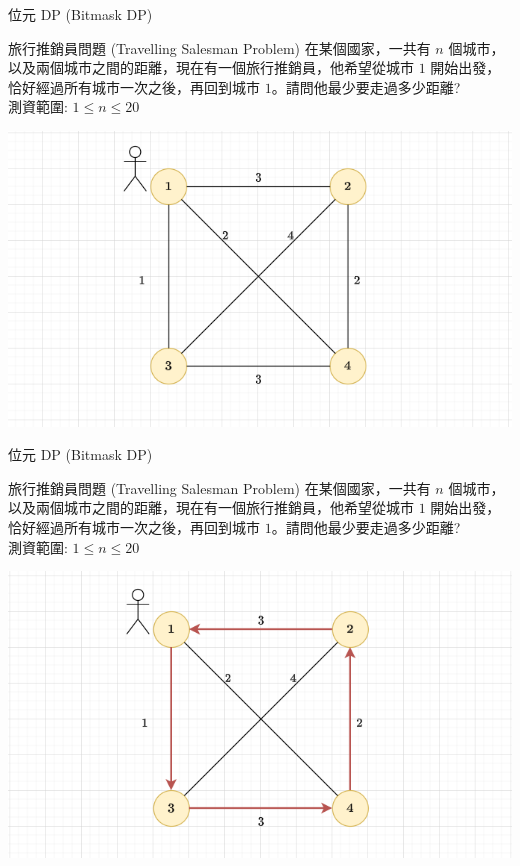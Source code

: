 \documentclass[aspectratio=169]{beamer}
\begin{document}
\begin{frame}[fragile]{位元 DP (Bitmask DP)}
    \begin{block}{旅行推銷員問題 (Travelling Salesman Problem)}
        在某個國家，一共有 $n$ 個城市，以及兩個城市之間的距離，現在有一個旅行推銷員，他希望從城市 $1$ 開始出發，恰好經過所有城市一次之後，再回到城市 $1$。請問他最少要走過多少距離?\\
        \vspace{5mm}
        測資範圍: $1 \le n \le 20$
    \end{block} 
    \begin{center}
        \includegraphics[scale=0.4]{images/TSP.png}
    \end{center}
\end{frame}

\begin{frame}[fragile]{位元 DP (Bitmask DP)}
    \begin{block}{旅行推銷員問題 (Travelling Salesman Problem)}
        在某個國家，一共有 $n$ 個城市，以及兩個城市之間的距離，現在有一個旅行推銷員，他希望從城市 $1$ 開始出發，恰好經過所有城市一次之後，再回到城市 $1$。請問他最少要走過多少距離?\\
        \vspace{5mm}
        測資範圍: $1 \le n \le 20$
    \end{block} 
    \begin{center}
        \includegraphics[scale=0.4]{images/TSP2.png}
    \end{center}
\end{frame}
\end{document}
